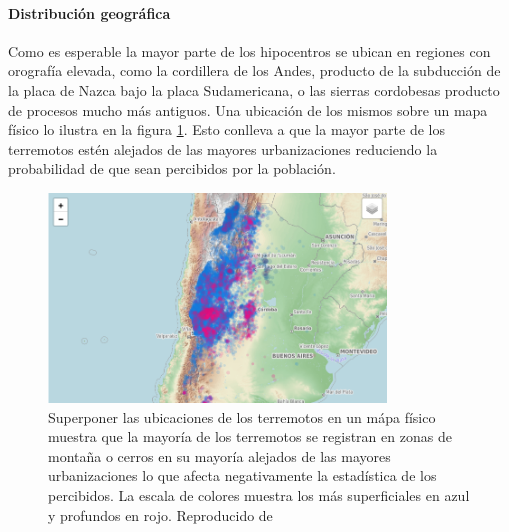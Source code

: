 \documentclass[a4paper]{report}
\begin{document}
\paragraph{Distribución geográfica}
Como es esperable la mayor parte de los hipocentros se ubican en regiones con orografía elevada, como la cordillera de los Andes, producto de la subducción de la placa de Nazca bajo la placa Sudamericana, o las sierras cordobesas producto de procesos mucho más antiguos. 
Una ubicación de los mismos sobre un mapa físico lo ilustra en la figura \ref{fig:mapa_sismos}.
Esto conlleva a que la mayor parte de los terremotos estén alejados de las mayores urbanizaciones reduciendo la probabilidad de que sean percibidos por la población.
\begin{figure}[!ht]
\centering
\includegraphics[width=0.8\textwidth]{mapa_sismos.png}
\caption{Superponer las ubicaciones de los terremotos en un mápa físico muestra que la mayoría de los terremotos se registran en zonas de montaña o cerros en su mayoría alejados de las mayores urbanizaciones lo que afecta negativamente la estadística de los percibidos.
La escala de colores muestra los más superficiales en azul y profundos en rojo.
Reproducido de \cite{daniela_parada_ic-datasets-docencia_nodate}}
\label{fig:mapa_sismos}
\end{figure}
\end{document}
